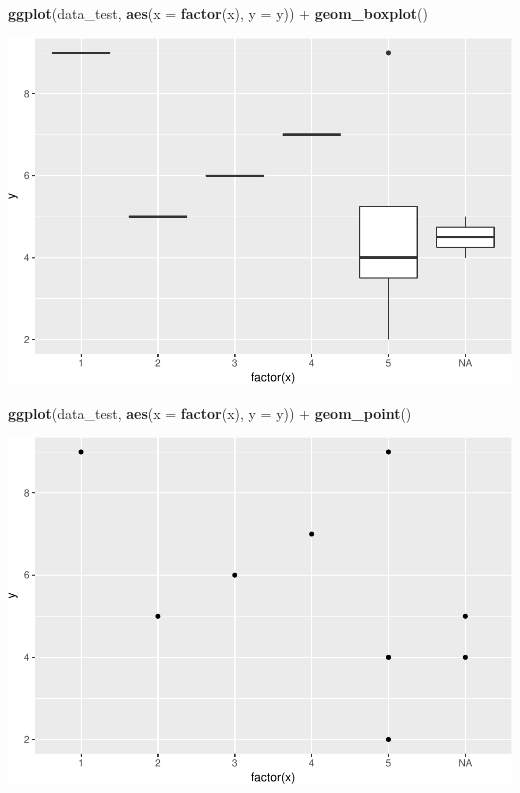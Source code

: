 \documentclass[]{article}
\newenvironment{Shaded}{\begin{snugshade}}{\end{snugshade}}
\newcommand{\KeywordTok}[1]{\textcolor[rgb]{0.13,0.29,0.53}{\textbf{{#1}}}}
\newcommand{\DataTypeTok}[1]{\textcolor[rgb]{0.13,0.29,0.53}{{#1}}}
\newcommand{\StringTok}[1]{\textcolor[rgb]{0.31,0.60,0.02}{{#1}}}
\newcommand{\NormalTok}[1]{{#1}}
\begin{document}
\begin{Shaded}
\begin{Highlighting}[]
  \KeywordTok{ggplot}\NormalTok{(data_test,}
         \KeywordTok{aes}\NormalTok{(}\DataTypeTok{x =} \KeywordTok{factor}\NormalTok{(x),}
             \DataTypeTok{y =} \NormalTok{y)) +}\StringTok{ }
\StringTok{  }\KeywordTok{geom_boxplot}\NormalTok{()}
\end{Highlighting}
\end{Shaded}

\includegraphics{jsm2017_files/figure-latex/unnamed-chunk-2-2.pdf}

\begin{Shaded}
\begin{Highlighting}[]
  \KeywordTok{ggplot}\NormalTok{(data_test,}
         \KeywordTok{aes}\NormalTok{(}\DataTypeTok{x =} \KeywordTok{factor}\NormalTok{(x),}
             \DataTypeTok{y =} \NormalTok{y)) +}\StringTok{ }
\StringTok{  }\KeywordTok{geom_point}\NormalTok{()}
\end{Highlighting}
\end{Shaded}

\includegraphics{jsm2017_files/figure-latex/unnamed-chunk-2-3.pdf}
\end{document}
